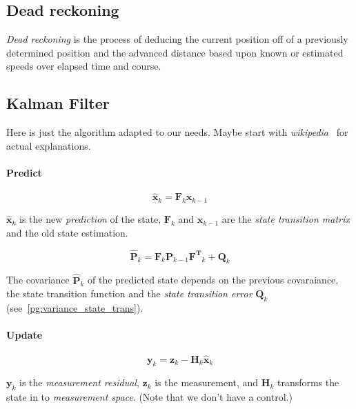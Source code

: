 \documentclass[a4paper, 12pt]{paper}
\begin{document}
\subsection{Dead reckoning}

\emph{Dead reckoning} is the process of deducing the current position off of a
previously determined position and the advanced distance based upon known or
estimated speeds over elapsed time and course.~\cite{wikipedia_dead_reckoning}

\subsection{Kalman Filter}

Here is just the algorithm adapted to our needs. Maybe start with
\emph{wikipedia}~\cite{wikipedia_lqe} for actual explanations.

\paragraph{Predict}

\begin{equation}
    \mathbf{\hat{x}}_k = \mathbf{F}_k \mathbf{{x}}_{k-1}
\label{eq:state_predict}
\end{equation}

$\mathbf{\hat{x}}_k$ is the new \emph{prediction} of the state,
$\mathbf{F}_k$ and $\mathbf{{x}}_{k-1}$ are the \emph{state transition matrix}
and the old state estimation.

\begin{equation}
    \mathbf{\hat P}_k = \mathbf{F}_k \mathbf{P}_{k-1} \mathbf{F^T}_k + \mathbf{Q}_k
\label{eq:cov_predict}
\end{equation}

The covariance $\mathbf{\hat P}_k$ of the predicted state depends on the previous
covaraiance, the state transition function and the \emph{state transition error}
$\mathbf{Q}_k$ (see~\ref{pg:variance_state_trans}).

\paragraph{Update}

\begin{equation}
    \mathbf{y}_k = \mathbf{z}_k - \mathbf{H}_k \mathbf{\hat x}_k
\label{eq:measurement_residual}
\end{equation}

$\mathbf{y}_k$ is the \emph{measurement residual}, $\mathbf{z}_k$ is the measurement,
and $\mathbf{H}_k$ transforms the state in to \emph{measurement space}. (Note that
we don't have a control.)
\end{document}
